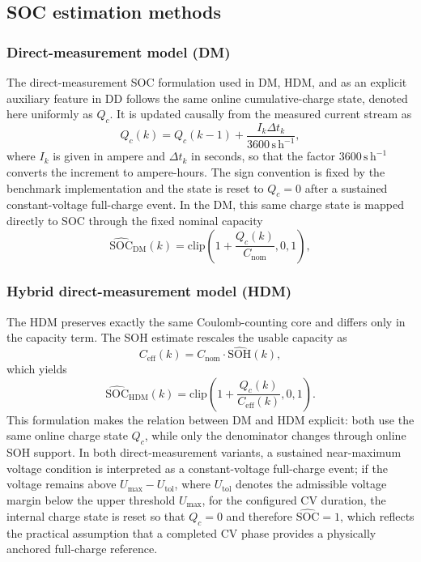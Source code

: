 \documentclass[review]{elsarticle}
\begin{document}
\subsection{SOC estimation methods}
\subsubsection{Direct-measurement model (DM)}
The direct-measurement SOC formulation used in DM, HDM, and as an explicit auxiliary feature in DD follows the same online cumulative-charge state, denoted here uniformly as $Q_c$. It is updated causally from the measured current stream as
\begin{equation}
    Q_c(k)=Q_c(k-1)+\frac{I_k \Delta t_k}{3600\,\mathrm{s\,h^{-1}}},
    \label{eq:qc_update}
\end{equation}
where $I_k$ is given in ampere and $\Delta t_k$ in seconds, so that the factor $3600\,\mathrm{s\,h^{-1}}$ converts the increment to ampere-hours. The sign convention is fixed by the benchmark implementation and the state is reset to $Q_c=0$ after a sustained constant-voltage full-charge event. In the DM, this same charge state is mapped directly to SOC through the fixed nominal capacity
\begin{equation}
    \widehat{\mathrm{SOC}}_{\mathrm{DM}}(k)=\mathrm{clip}\!\left(1+\frac{Q_c(k)}{C_{\mathrm{nom}}},0,1\right),
    \label{eq:soc_dm}
\end{equation}

\subsubsection{Hybrid direct-measurement model (HDM)}
The HDM preserves exactly the same Coulomb-counting core and differs only in the capacity term. The SOH estimate rescales the usable capacity as
\begin{equation}
    C_{\mathrm{eff}}(k)=C_{\mathrm{nom}} \cdot \widehat{\mathrm{SOH}}(k),
    \label{eq:ceff}
\end{equation}
which yields
\begin{equation}
    \widehat{\mathrm{SOC}}_{\mathrm{HDM}}(k)=\mathrm{clip}\!\left(1+\frac{Q_c(k)}{C_{\mathrm{eff}}(k)},0,1\right).
    \label{eq:soc_hdm}
\end{equation}
This formulation makes the relation between DM and HDM explicit: both use the same online charge state $Q_c$, while only the denominator changes through online SOH support. In both direct-measurement variants, a sustained near-maximum voltage condition is interpreted as a constant-voltage full-charge event; if the voltage remains above $U_{\max}-U_{\mathrm{tol}}$, where $U_{\mathrm{tol}}$ denotes the admissible voltage margin below the upper threshold $U_{\max}$, for the configured CV duration, the internal charge state is reset so that $Q_c=0$ and therefore $\widehat{\mathrm{SOC}}=1$, which reflects the practical assumption that a completed CV phase provides a physically anchored full-charge reference.
\end{document}
